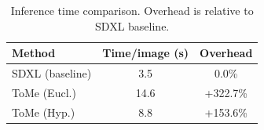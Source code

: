 \begin{table}[t]
\centering
\caption{Inference time comparison. Overhead is relative to SDXL baseline.}
\label{tab:time_complexity}
\begin{tabular}{l|cc}
\toprule
Method & Time/image (s) & Overhead \\
\midrule
SDXL (baseline) & 3.5 & 0.0\% \\
ToMe (Eucl.) & 14.6 & +322.7\% \\
ToMe (Hyp.) & 8.8 & +153.6\% \\
\bottomrule
\end{tabular}
\end{table}
